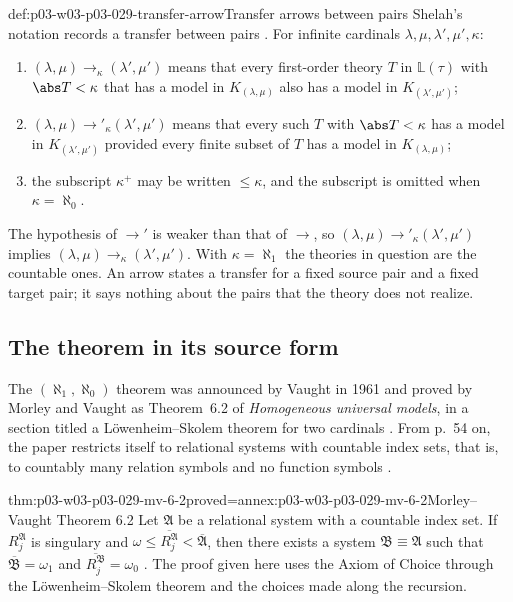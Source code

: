 \begin{hbconvention}{def:p03-w03-p03-029-transfer-arrow}{Transfer arrows between pairs}
Shelah's notation records a transfer between pairs
\cite[p.~3, 0.2~Definition]{Shelah2004PairAlephN}. For infinite cardinals
\(\lambda,\mu,\lambda',\mu',\kappa\):
\begin{enumerate}
  \item \((\lambda,\mu)\to_\kappa(\lambda',\mu')\) means that every
        first-order theory \(T\) in \(\mathbb L(\tau)\) with \(\abs T<\kappa\)
        that has a model in \(K_{(\lambda,\mu)}\) also has a model in
        \(K_{(\lambda',\mu')}\);
  \item \((\lambda,\mu)\to'_\kappa(\lambda',\mu')\) means that every such
        \(T\) with \(\abs T<\kappa\) has a model in \(K_{(\lambda',\mu')}\)
        provided every finite subset of \(T\) has a model in
        \(K_{(\lambda,\mu)}\);
  \item the subscript \(\kappa^+\) may be written \({\leq}\kappa\), and the
        subscript is omitted when \(\kappa=\aleph_0\).
\end{enumerate}
The hypothesis of \(\to'\) is weaker than that of \(\to\), so
\((\lambda,\mu)\to'_\kappa(\lambda',\mu')\) implies
\((\lambda,\mu)\to_\kappa(\lambda',\mu')\). With \(\kappa=\aleph_1\) the
theories in question are the countable ones. An arrow states a transfer for a
fixed source pair and a fixed target pair; it says nothing about the pairs
that the theory does not realize.
\end{hbconvention}

\subsection{The theorem in its source form}

The \((\aleph_1,\aleph_0)\) theorem was announced by Vaught in 1961 and
proved by Morley and Vaught as Theorem~6.2 of \emph{Homogeneous universal
models}, in a section titled a L\"owenheim--Skolem theorem for two cardinals
\cite[p.~55 and reference~25 on p.~57]{MorleyVaught1962}. From p.~54 on,
the paper restricts itself to relational systems with countable index sets,
that is, to countably many relation symbols and no function symbols
\cite[p.~54]{MorleyVaught1962}.

\begin{hbtheorem}{thm:p03-w03-p03-029-mv-6-2}{proved=annex:p03-w03-p03-029-mv-6-2}{Morley--Vaught Theorem 6.2}
Let \(\mathfrak A\) be a relational system with a countable index set. If
\(R_j^{\mathfrak A}\) is singulary and
\(\omega\leq\overline{R_j^{\mathfrak A}}<\overline{\mathfrak A}\), then
there exists a system \(\mathfrak B\equiv\mathfrak A\) such that
\(\overline{\mathfrak B}=\omega_1\) and
\(\overline{R_j^{\mathfrak B}}=\omega_0\)
\cite[p.~55, Theorem~6.2; standing hypothesis p.~54]{MorleyVaught1962}.
The proof given here uses the Axiom of Choice through the
L\"owenheim--Skolem theorem and the choices made along the recursion.
\end{hbtheorem}

